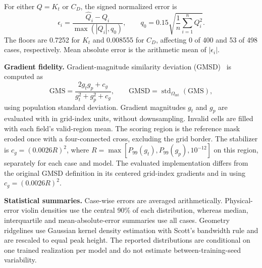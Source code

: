 \documentclass[11pt]{article}
\newcommand{\detail}[1]{\par\Needspace{4\baselineskip}\textbf{#1}\enspace}
\newcommand{\code}[1]{\texttt{\detokenize{#1}}}
\begin{document}
For either $Q=K_t$ or $C_D$, the signed normalized error is
\begin{equation}
 \epsilon_i=\frac{\widehat Q_i-Q_i}{\max(|Q_i|,q_0)},
 \qquad q_0=0.15\sqrt{\frac1n\sum_{i=1}^{n}Q_i^2}.
 \label{eq:physical-error}
\end{equation}
The floors are 0.7252 for $K_t$ and 0.008555 for $C_D$, affecting 0 of 400 and 53 of 498 cases, respectively. Mean absolute error is the arithmetic mean of $|\epsilon_i|$.

\detail{Gradient fidelity.} Gradient-magnitude similarity deviation (GMSD)~\cite{xue2014gmsd} is computed as
\begin{equation}
 \mathrm{GMS}=\frac{2g_tg_p+c_g}{g_t^2+g_p^2+c_g},
 \qquad
 \mathrm{GMSD}=\operatorname{std}_{\Omega_{\mathrm{int}}}(\mathrm{GMS}),
 \label{eq:gmsd}
\end{equation}
using population standard deviation. Gradient magnitudes $g_t$ and $g_p$ are evaluated with \code{numpy.gradient} in grid-index units, without downsampling. Invalid cells are filled with each field's valid-region mean. The scoring region is the reference mask eroded once with a four-connected cross, excluding the grid border. The stabilizer is $c_g=(0.0026R)^2$, where $R=\max[P_{99}(g_t),P_{99}(g_p),10^{-12}]$ on this region, separately for each case and model. The evaluated implementation differs from the original GMSD definition in its centered grid-index gradients and in using $c_g=(0.0026R)^2$.

\detail{Statistical summaries.} Case-wise errors are averaged arithmetically. Physical-error violin densities use the central 90\% of each distribution, whereas median, interquartile and mean-absolute-error summaries use all cases. Geometry ridgelines use Gaussian kernel density estimation with Scott's bandwidth rule and are rescaled to equal peak height. The reported distributions are conditional on one trained realization per model and do not estimate between-training-seed variability.
\end{document}
